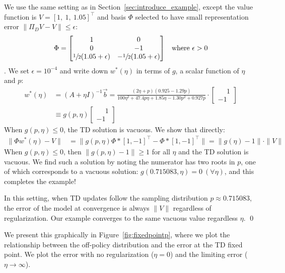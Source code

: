 \proof We use the same setting as in Section~\ref{sec:introduce_example}, except the value function is $V = [1,~1,~1.05]^\top$ and basis $\Phi$ selected to have small representation error $\|\Pi_D V - V\| \leq \epsilon$:
\begin{align}
  \Phi & = \begin{bmatrix}
              1                              & 0                               \\
              0                              & -1                              \\
              \sfrac{1}{2} (1.05 + \epsilon) & -\sfrac{1}{2} (1.05 + \epsilon) \\
            \end{bmatrix} & \text{where $\epsilon > 0$}
\end{align}.
We set $\epsilon = 10^{-4}$ and write down $w^*(\eta)$ in terms of $g$, a scalar function of $\eta$ and $p$:
\begin{align}
  w^*(\eta) & = (A+\eta I)^{-1} \vec b =
  \frac{(2\eta + p)(0.925 - 1.29p)}{100\eta^2+47.4p\eta +1.85\eta - 1.30p^2 + 0.927p}
  \cdot \begin{bmatrix} \phantom{-}1 \\ -1 \end{bmatrix}
  \\ & \equiv g(p,\eta) \begin{bmatrix} \phantom{-}1 \\ -1 \end{bmatrix} \label{eqn:wstarrr2}
\end{align}
When $g(p,\eta) \leq 0$, the TD solution is vacuous. We show that directly:
\begin{align}
  \|\Phi w^*(\eta) - V\| & =
  \|g(p,\eta) \Phi*[1, -1]^\top - \Phi*[1, -1]^\top\|
  = \|g(\eta) - 1\|\cdot\|V\|
\end{align}
When $g(p,\eta) \leq 0$, then $\|g(p,\eta) - 1\| \geq 1$ for all $\eta$ and the TD solution is vacuous. We find such a solution by noting the numerator has two roots in $p$, one of which corresponds to a vacuous solution:
$g(0.715083, \eta) = 0~(\forall \eta)$, and this completes the example!

In this setting, when TD updates follow the sampling distribution $p\approx0.715083$, the error of the model at convergence is always $\|V\|$ regardless of regularization. Our example converges to the same vacuous value regardless $\eta$. \qed

We present this graphically in Figure~\ref{fig:fixedpointp}, where we plot the relationship between the off-policy distribution and the error at the TD fixed point. We plot the error with no regularization ($\eta=0$) and the limiting error ($\eta\to\infty$).

